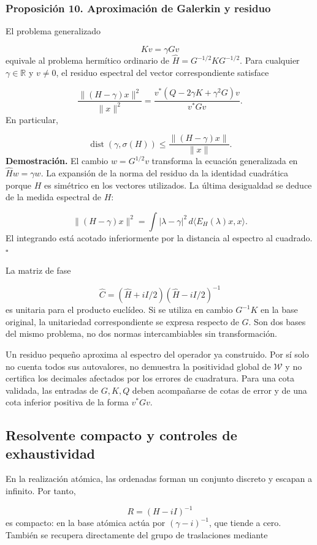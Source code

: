 \subsubsection*{Proposición 10. Aproximación de Galerkin y residuo}
El problema generalizado

\[
Kv=\gamma Gv
\]
equivale al problema hermítico ordinario de \(\widehat H=G^{-1/2}KG^{-1/2}\). Para cualquier \(\gamma\in\mathbb R\) y \(v\neq0\), el residuo espectral del vector correspondiente satisface

\[
\frac{\|(H-\gamma)x\|^2}{\|x\|^2}
=\frac{v^*(Q-2\gamma K+\gamma^2G)v}{v^*Gv}.
\]
En particular,

\[
\operatorname{dist}(\gamma,\sigma(H))
\leq\frac{\|(H-\gamma)x\|}{\|x\|}.
\]
\textbf{Demostración.} El cambio \(w=G^{1/2}v\) transforma la ecuación generalizada en \(\widehat Hw=\gamma w\). La expansión de la norma del residuo da la identidad cuadrática porque \(H\) es simétrico en los vectores utilizados. La última desigualdad se deduce de la medida espectral de \(H\):

\[
\|(H-\gamma)x\|^2
=\int |\lambda-\gamma|^2\,d\langle E_H(\lambda)x,x\rangle.
\]
El integrando está acotado inferiormente por la distancia al espectro al cuadrado. \hfill\(\square\)

La matriz de fase

\[
\widehat C=(\widehat H+iI/2)(\widehat H-iI/2)^{-1}
\]
es unitaria para el producto euclídeo. Si se utiliza en cambio \(G^{-1}K\) en la base original, la unitariedad correspondiente se expresa respecto de \(G\). Son dos bases del mismo problema, no dos normas intercambiables sin transformación.

Un residuo pequeño aproxima al espectro del operador ya construido. Por sí solo no cuenta todos sus autovalores, no demuestra la positividad global de \(\mathscr W\) y no certifica los decimales afectados por los errores de cuadratura. Para una cota validada, las entradas de \(G,K,Q\) deben acompañarse de cotas de error y de una cota inferior positiva de la forma \(v^*Gv\).

\subsection{Resolvente compacto y controles de exhaustividad}
En la realización atómica, las ordenadas forman un conjunto discreto y escapan a infinito. Por tanto,

\[
R=(H-iI)^{-1}
\]
es compacto: en la base atómica actúa por \((\gamma-i)^{-1}\), que tiende a cero. También se recupera directamente del grupo de traslaciones mediante

